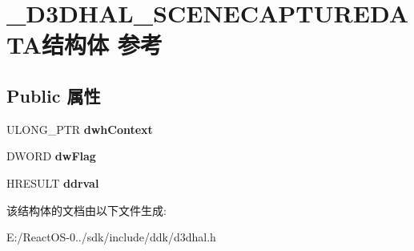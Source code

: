 \hypertarget{struct___d3_d_h_a_l___s_c_e_n_e_c_a_p_t_u_r_e_d_a_t_a}{}\section{\+\_\+\+D3\+D\+H\+A\+L\+\_\+\+S\+C\+E\+N\+E\+C\+A\+P\+T\+U\+R\+E\+D\+A\+T\+A结构体 参考}
\label{struct___d3_d_h_a_l___s_c_e_n_e_c_a_p_t_u_r_e_d_a_t_a}
\subsection*{Public 属性}
\begin{DoxyCompactItemize}
\item 
\mbox{\label{struct___d3_d_h_a_l___s_c_e_n_e_c_a_p_t_u_r_e_d_a_t_a_a78fa9979e21d51c2a2982c65d7a2f702}} 
U\+L\+O\+N\+G\+\_\+\+P\+TR {\bfseries dwh\+Context}
\item 
\mbox{\label{struct___d3_d_h_a_l___s_c_e_n_e_c_a_p_t_u_r_e_d_a_t_a_a44608c2f442a6ca735e83d475ad83268}} 
D\+W\+O\+RD {\bfseries dw\+Flag}
\item 
\mbox{\label{struct___d3_d_h_a_l___s_c_e_n_e_c_a_p_t_u_r_e_d_a_t_a_a714f23ab9ffcaf693301c31a18b3a156}} 
H\+R\+E\+S\+U\+LT {\bfseries ddrval}
\end{DoxyCompactItemize}


该结构体的文档由以下文件生成\+:\begin{DoxyCompactItemize}
\item 
E\+:/\+React\+O\+S-\/0../sdk/include/ddk/d3dhal.\+h\end{DoxyCompactItemize}
